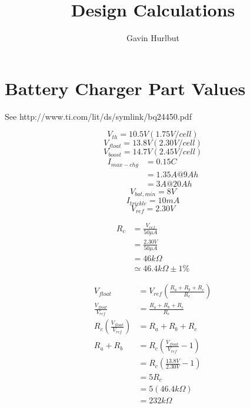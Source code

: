 \documentclass[11pt]{article} %
\title{Design Calculations}
\author{Gavin Hurlbut}
\begin{document}
\maketitle

\section{Battery Charger Part Values}
See http://www.ti.com/lit/ds/symlink/bq24450.pdf

\[ V_{th} = 10.5V (1.75V/cell) \]
\[ V_{float} = 13.8V (2.30V/cell) \]
\[ V_{boost} = 14.7V (2.45V/cell) \]
\begin{align*}
I_{max-chg} &= 0.15C \\
&= 1.35A @ 9Ah \\
&= 3A @ 20Ah
\end{align*}
\[ V_{bat,min} = 8V \]
\[ I_{trickle} = 10mA \]
\[ V_{ref} = 2.30V \]

\begin{align*}
R_c &= \frac{V_{ref}}{50\mu A} \\
&= \frac{2.30V}{50\mu A} \\ 
&= 46k\Omega \\
&\simeq 46.4k\Omega \pm 1\% \tag{1}
\end{align*}

\begin{align*}
V_{float} &= V_{ref}\left(\frac{R_a + R_b + R_c}{R_c}\right) \\
\frac{V_{float}}{V_{ref}} &= \frac{R_a + R_b + R_c}{R_c} \\
R_c \left(\frac{V_{float}}{V_{ref}}\right) &= R_a + R_b + R_c \\
R_a + R_b &= R_c\left(\frac{V_{float}}{V_{ref}} - 1\right) \\
&= R_c\left(\frac{13.8V}{2.30V} - 1\right) \\
&= 5R_c \\
&= 5\left(46.4k\Omega\right) \\
&= 232k\Omega \tag{2}
\end{align*}
\end{document}
